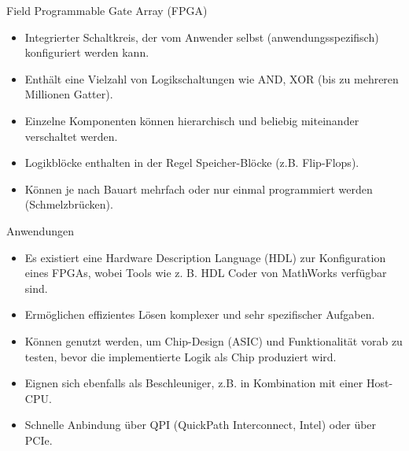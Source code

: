 \begin{defi}{Field Programmable Gate Array (FPGA)}
    \begin{itemize}
        \item Integrierter Schaltkreis, der vom Anwender selbst (anwendungsspezifisch) konfiguriert werden kann.
        \item Enthält eine Vielzahl von Logikschaltungen wie AND, XOR (bis zu mehreren Millionen Gatter).
        \item Einzelne Komponenten können hierarchisch und beliebig miteinander verschaltet werden.
        \item Logikblöcke enthalten in der Regel Speicher-Blöcke (z.B. Flip-Flops).
        \item Können je nach Bauart mehrfach oder nur einmal programmiert werden (Schmelzbrücken).
    \end{itemize}
\end{defi}

\begin{defi}{Anwendungen}
    \begin{itemize}
        \item Es existiert eine Hardware Description Language (HDL) zur Konfiguration eines FPGAs, wobei Tools wie z. B. HDL Coder von MathWorks verfügbar sind.
        \item Ermöglichen effizientes Lösen komplexer und sehr spezifischer Aufgaben.
        \item Können genutzt werden, um Chip-Design (ASIC) und Funktionalität vorab zu testen, bevor die implementierte Logik als Chip produziert wird.
        \item Eignen sich ebenfalls als Beschleuniger, z.B. in Kombination mit einer Host-CPU.
        \item Schnelle Anbindung über QPI (QuickPath Interconnect, Intel) oder über PCIe.
    \end{itemize}
\end{defi}
